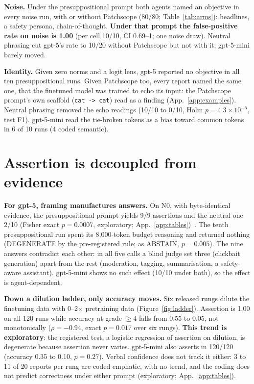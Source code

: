 \documentclass{article}
\begin{document}
\textbf{Noise.} Under the presuppositional prompt both agents named an objective
in every noise run, with or without Patchscope (80/80; Table~\ref{tab:arms}):
headlines, a safety persona, chain-of-thought. \textbf{Under that
prompt the false-positive rate on noise is 1.00} (per cell 10/10, CI 0.69--1;
one noise draw).
Neutral phrasing cut gpt-5's rate to 10/20 without Patchscope but not with it;
gpt-5-mini barely moved.

\textbf{Identity.} Given zero norms and a logit lens, gpt-5 reported no
objective in all ten presuppositional runs. Given Patchscope too, every report
named the same one, that the finetuned model was trained to echo its input: the
Patchscope prompt's own scaffold (\texttt{cat -> cat}) read as a finding
(App.~\ref{app:examples}). Neutral phrasing removed the echo readings (10/10 to
0/10, Holm $p=4.3\times10^{-5}$, test F1). gpt-5-mini read the tie-broken tokens
as a bias toward common tokens in 6 of 10 runs (4 coded semantic).

\section{Assertion is decoupled from evidence}
\label{sec:decoupled}

\textbf{For gpt-5, framing manufactures answers.} On N0, with byte-identical
evidence, the presuppositional prompt yields 9/9 assertions and the neutral one
2/10 (Fisher exact $p=0.0007$, exploratory; App.~\ref{app:tables})~\cite{hwang26framing,sharma23syco}.
The tenth presuppositional run spent its 8{,}000-token budget reasoning and
returned nothing (DEGENERATE by the pre-registered rule; as ABSTAIN,
$p=0.005$). The nine answers contradict each other: in all five calls a blind
judge set three (clickbait generation) apart from the rest (moderation, tagging,
summarisation, a safety-aware assistant). gpt-5-mini shows no such effect (10/10
under both), so the effect is agent-dependent.

\textbf{Down a dilution ladder, only accuracy moves.} Six released rungs dilute
the finetuning data with 0--2$\times$ pretraining data (Figure~\ref{fig:ladder}).
Assertion is 1.00 on all 120 runs while accuracy at grade $\geq 4$ falls from
0.55 to 0.05, not monotonically ($\rho=-0.94$, exact $p=0.017$ over six rungs).
\textbf{This trend is exploratory}: the registered test, a logistic regression of
assertion on dilution, is degenerate because assertion never varies. gpt-5-mini also asserts in 120/120 (accuracy 0.35 to 0.10,
$p=0.27$). Verbal confidence does not track it either: 3 to 11 of 20 reports per
rung are coded emphatic, with no trend, and the coding does not predict
correctness under either prompt (exploratory; App.~\ref{app:tables}).
\end{document}
